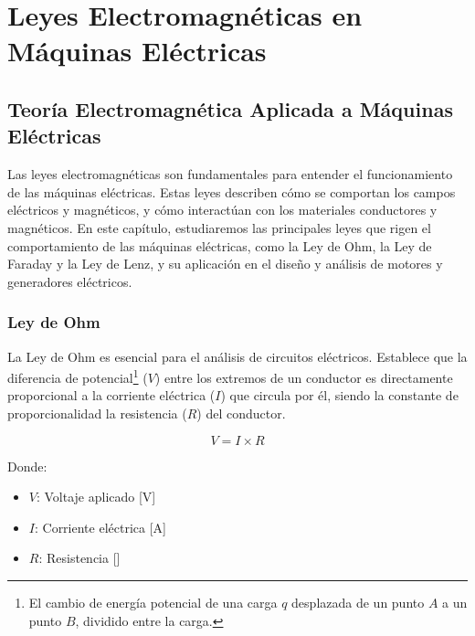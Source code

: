 \documentclass[../main]{subfiles}
\begin{document}
\chapter{Leyes Electromagnéticas en Máquinas Eléctricas}

\section{Teoría Electromagnética Aplicada a Máquinas Eléctricas}

Las leyes electromagnéticas son fundamentales para entender el funcionamiento de las máquinas eléctricas. Estas leyes describen cómo se comportan los campos eléctricos y magnéticos, y cómo interactúan con los materiales conductores y magnéticos. En este capítulo, estudiaremos las principales leyes que rigen el comportamiento de las máquinas eléctricas, como la Ley de Ohm, la Ley de Faraday y la Ley de Lenz, y su aplicación en el diseño y análisis de motores y generadores eléctricos.

\subsection{Ley de Ohm}

La Ley de Ohm es esencial para el análisis de circuitos eléctricos. Establece que la diferencia de potencial\footnote{El cambio de energía potencial de una carga \(q\) desplazada de un punto \(A\) a un punto \(B\), dividido entre la carga.} (\(V\)) entre los extremos de un conductor es directamente proporcional a la corriente eléctrica (\(I\)) que circula por él, siendo la constante de proporcionalidad la resistencia (\(R\)) del conductor.

\begin{equation}
V = I \times R
\end{equation}

Donde:
\begin{itemize}
    \item \(V\): Voltaje aplicado [V]
    \item \(I\): Corriente eléctrica [A]
    \item \(R\): Resistencia [\Omega]
\end{itemize}

\end{document}
